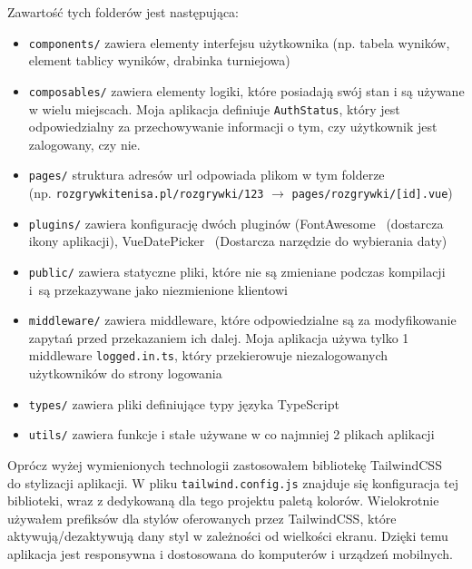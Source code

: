 \documentclass[shortabstract]{iithesis}
\begin{document}
\noindent
Zawartość tych folderów jest następująca:
\begin{itemize}
    \item \texttt{components/} zawiera elementy interfejsu użytkownika (np. tabela wyników, element tablicy wyników, drabinka turniejowa)
    \item \texttt{composables/} zawiera elementy logiki, które posiadają swój stan i są używane w wielu miejscach. Moja aplikacja definiuje \texttt{AuthStatus}, który jest odpowiedzialny za przechowywanie informacji o tym, czy użytkownik jest zalogowany, czy nie.
    \item \texttt{pages/} struktura adresów url odpowiada plikom w tym folderze\\(np. \texttt{rozgrywkitenisa.pl/rozgrywki/123} $\longrightarrow$ \texttt{pages/rozgrywki/[id].vue})
    \item \texttt{plugins/} zawiera konfigurację dwóch pluginów (FontAwesome~\cite{FontAwesome} (dostarcza ikony aplikacji), VueDatePicker~\cite{VueDatePicker} (Dostarcza narzędzie do wybierania daty)
    \item \texttt{public/} zawiera statyczne pliki, które nie są zmieniane podczas kompilacji i~są przekazywane jako niezmienione klientowi
    \item \texttt{middleware/} zawiera middleware, które odpowiedzialne są za modyfikowanie zapytań przed przekazaniem ich dalej. Moja aplikacja używa tylko 1 middleware \texttt{logged.in.ts}, który przekierowuje niezalogowanych użytkowników do strony logowania
    \item \texttt{types/} zawiera pliki definiujące typy języka TypeScript
    \item \texttt{utils/} zawiera funkcje i stałe używane w co najmniej 2 plikach aplikacji
\end{itemize}
Oprócz wyżej wymienionych technologii zastosowałem bibliotekę TailwindCSS~\cite{TailwindCSS} do stylizacji aplikacji.
W pliku \texttt{tailwind.config.js} znajduje się konfiguracja tej biblioteki, wraz z dedykowaną dla tego projektu paletą kolorów.
Wielokrotnie używałem prefiksów dla stylów oferowanych przez TailwindCSS, które aktywują/dezaktywują dany styl w zależności od wielkości ekranu.
Dzięki temu aplikacja jest responsywna i dostosowana do komputerów i urządzeń mobilnych.
\end{document}
